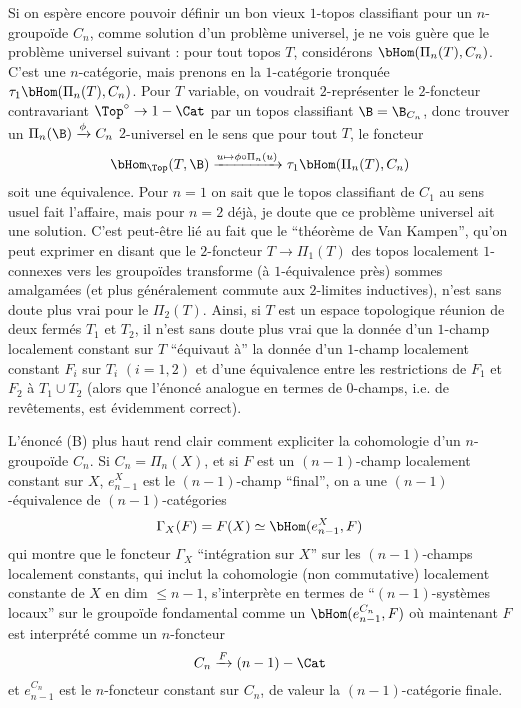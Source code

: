 Si on espère encore pouvoir définir un bon vieux $1$-topos classifiant pour un $n$-groupoïde $C_n$, comme solution d’un problème universel, je ne vois guère que le problème universel suivant : pour tout topos $T$, considérons $\bHom(\Pi_n(T), C_n)$. C’est une $n$-catégorie, mais prenons en la $1$-catégorie tronquée $\tau_1 \bHom(\Pi_n(T), C_n)$. Pour $T$ variable, on voudrait $2$-représenter le $2$-foncteur contravariant $\Top^{\circ} \to 1-\Cat$ par un topos classifiant $\B = \B_{C_n}$, donc trouver un $\Pi_n(\B) \xrightarrow{\phi} C_n$ $2$-universel en le sens que pour tout $T$, le foncteur
$$
\bHom_{\Top}(T, \B) \xrightarrow {u \mapsto \phi \circ \Pi_n(u)} \tau_1 \bHom(\Pi_n(T), C_n)
$$
soit une équivalence. Pour $n = 1$ on sait que le topos classifiant de $C_1$ au sens usuel fait l'affaire, mais pour $n = 2$ déjà, je doute que ce problème universel ait une solution. C'est peut-être lié au fait que le ``théorème de Van Kampen'', qu'on peut exprimer en disant que le $2$-foncteur $T \to \Pi_1(T)$ des topos localement $1$-connexes vers les groupoïdes transforme (à $1$-équivalence près) sommes amalgamées (et plus généralement commute aux $2$-limites inductives), n'est sans doute plus vrai pour le $\Pi_2(T)$. Ainsi, si $T$ est un espace topologique réunion de deux fermés $T_1$ et $T_2$, il n'est sans doute plus vrai  que la donnée d'un $1$-champ localement constant sur $T$ ``équivaut à'' la donnée d'un $1$-champ localement constant $F_i$ sur $T_i$ $(i = 1, 2)$ et d'une équivalence entre les restrictions de $F_1$ et $F_2$ à $T_1 \cup T_2$ (alors que l'énoncé analogue en termes de $0$-champs, i.e. de revêtements, est évidemment correct).

\label{sec:app7}%
L'énoncé (B) plus haut rend clair comment expliciter la cohomologie d'un $n$-groupoïde $C_n$. Si $C_n = \Pi_n(X)$, et si $F$ est un $(n-1)$-champ localement constant sur $X$, $e^X_{n-1}$ est le $(n-1)$-champ ``final'', on a une $(n-1)$-équivalence de $(n-1)$-catégories
$$
\Gamma_X(F) = F(X) \simeq \bHom(e^X_{n-1}, F)
$$
qui montre que le foncteur $\Gamma_X$ ``intégration sur $X$'' sur les $(n-1)$-champs localement constants, qui inclut la cohomologie (non commutative) localement constante de $X$ en dim $\leq n-1$, s'interprète en termes de ``$(n-1)$-systèmes locaux'' sur le groupoïde fondamental comme un $\bHom(e^{C_n}_{n-1}, F)$ où maintenant $F$ est interprété comme un $n$-foncteur 
$$
C_n \xrightarrow{F} (n-1)-\Cat
$$
et $e^{C_n}_{n-1}$ est le $n$-foncteur constant sur $C_n$, de valeur la $(n-1)$-catégorie finale.

